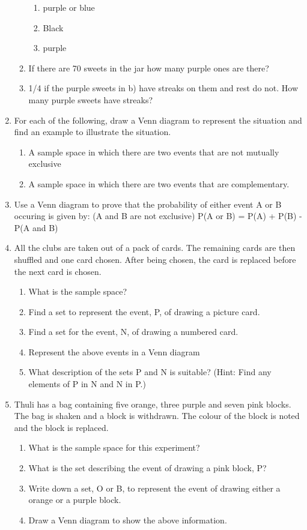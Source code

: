 \documentclass[10pt,a4paper,titlepage,twoside,openright]{report}
\begin{document}
\begin{enumerate}
\begin{enumerate}
		\begin{enumerate}
		\item purple or blue
		\item Black
		\item purple
		\end{enumerate} 
	\item If there are 70 sweets in the jar how many purple ones are there? 
	\item 1/4 if the purple sweets in b) have streaks on them and rest do not. How many purple sweets have streaks? 
	\end{enumerate}
\item For each of the following, draw a Venn diagram to represent the situation and find an example to illustrate the situation. 
\begin{enumerate}
\item A sample space in which there are two events that are not mutually exclusive
\item A sample space in which there are two events that are complementary.
\end{enumerate}
\item Use a Venn diagram to prove that the probability of either event A or B occuring is given by: (A and B are not exclusive) \newline
P(A or B) = P(A) + P(B) - P(A and B) 
\item
All the clubs are taken out of a pack of cards. The remaining cards are then shuffled and one card chosen. After being chosen, the card is replaced before the next card is chosen. 
\begin{enumerate}
\item What is the sample space? 
\item Find a set to represent the event, P, of drawing a picture card. 
\item Find a set for the event, N, of drawing a numbered card. 
\item Represent the above events in a Venn diagram
\item What description of the sets P and N is suitable? (Hint: Find any elements of P in N and N in P.)
\end{enumerate}
\item Thuli has a bag containing five orange, three purple and seven pink blocks. The bag is shaken and a block is withdrawn. The colour of the block is noted and the block is replaced. 
\begin{enumerate}
\item What is the sample space for this experiment? 
\item What is the set describing the event of drawing a pink block, P?
\item Write down a set, O or B, to represent the event of drawing either a orange or a purple block. 
\item Draw a Venn diagram to show the above information.
\end{enumerate}
\end{enumerate}
\end{document}
